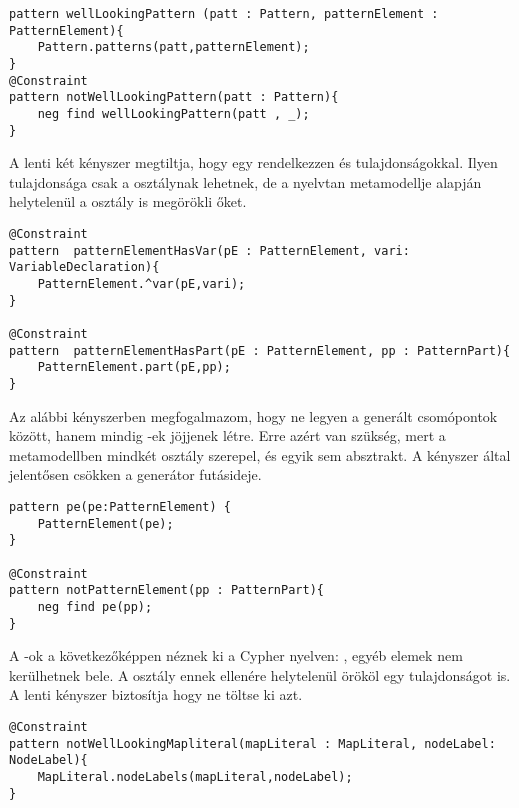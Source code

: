 \begin{lstlisting}[style=viatrasmall]
pattern wellLookingPattern (patt : Pattern, patternElement : PatternElement){
	Pattern.patterns(patt,patternElement);
}
@Constraint 
pattern notWellLookingPattern(patt : Pattern){
	neg find wellLookingPattern(patt , _);
}
\end{lstlisting}


A lenti két kényszer megtiltja, hogy egy  rendelkezzen  és   tulajdonságokkal. Ilyen tulajdonsága csak a  osztálynak lehetnek, de a nyelvtan metamodellje alapján helytelenül a  osztály is megörökli őket. 

\begin{lstlisting}[style=viatrasmall]
@Constraint
pattern  patternElementHasVar(pE : PatternElement, vari: VariableDeclaration){
	PatternElement.^var(pE,vari);
}

@Constraint
pattern  patternElementHasPart(pE : PatternElement, pp : PatternPart){
	PatternElement.part(pE,pp);
}
\end{lstlisting}

Az alábbi kényszerben megfogalmazom, hogy ne legyen  a generált csomópontok között, hanem mindig -ek jöjjenek létre. Erre azért van szükség, mert a metamodellben mindkét osztály szerepel, és egyik sem absztrakt. A kényszer által jelentősen csökken a generátor futásideje.

\begin{lstlisting}[style=viatrasmall]
pattern pe(pe:PatternElement) {
	PatternElement(pe);
}

@Constraint
pattern notPatternElement(pp : PatternPart){
	neg find pe(pp);
}
\end{lstlisting}


A -ok a következőképpen néznek  ki a Cypher nyelven: , egyéb elemek nem kerülhetnek bele. A  osztály ennek ellenére helytelenül örököl egy  tulajdonságot is. A lenti kényszer biztosítja hogy ne töltse ki azt.

\begin{lstlisting}[style=viatrasmall]
@Constraint
pattern notWellLookingMapliteral(mapLiteral : MapLiteral, nodeLabel: NodeLabel){
	MapLiteral.nodeLabels(mapLiteral,nodeLabel);
}

\end{lstlisting}

